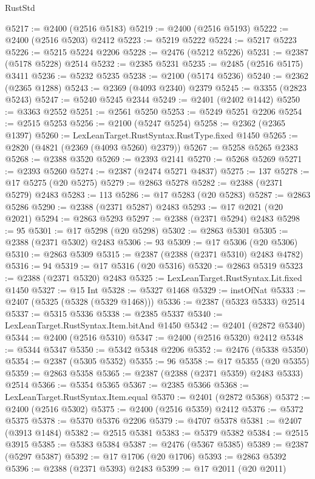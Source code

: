 \begin{lexlean}{RustStd}
\begin{coremodule}
@5217 := @2400 (@2516 @5183)
@5219 := @2400 (@2516 @5193)
@5222 := @2400 (@2516 @5203) @2412
@5223 := @5219 @5222
@5224 := @5217 @5223
@5226 := @5215 @5224 @2206
@5228 := @2476 (@5212 @5226)
@5231 := @2387 (@5178 @5228) @2514
@5232 := @2385 @5231
@5235 := @2485 (@2516 @5175) @3411
@5236 := @5232 @5235
@5238 := @2100 (@5174 @5236)
@5240 := @2362 (@2365 @1288)
@5243 := @2369 (@4093 @2340) @2379
@5245 := @3355 (@2823 @5243)
@5247 := @5240 @5245 @2344
@5249 := @2401 (@2402 @1442)
@5250 := @3363 @2552
@5251 := @2561 @5250
@5253 := @5249 @5251 @2206
@5254 := @2515 @5253
@5256 := @2100 (@5247 @5254)
@5258 := @2362 (@2365 @1397)
@5260 := LexLeanTarget.RustSyntax.RustType.fixed @1450
@5265 := @2820 (@4821 (@2369 (@4093 @5260) @2379))
@5267 := @5258 @5265 @2383
@5268 := @2388 @3520
@5269 := @2393 @2141
@5270 := @5268 @5269
@5271 := @2393 @5260
@5274 := @2387 (@2474 @5271 @4837)
@5275 := 137
@5278 := @17 @5275 (@20 @5275)
@5279 := @2863 @5278
@5282 := @2388 (@2371 @5279) @2483
@5283 := 113
@5286 := @17 @5283 (@20 @5283)
@5287 := @2863 @5286
@5290 := @2388 (@2371 @5287) @2483
@5293 := @17 @2021 (@20 @2021)
@5294 := @2863 @5293
@5297 := @2388 (@2371 @5294) @2483
@5298 := 95
@5301 := @17 @5298 (@20 @5298)
@5302 := @2863 @5301
@5305 := @2388 (@2371 @5302) @2483
@5306 := 93
@5309 := @17 @5306 (@20 @5306)
@5310 := @2863 @5309
@5315 := @2387 (@2388 (@2371 @5310) @2483 @4782)
@5316 := 94
@5319 := @17 @5316 (@20 @5316)
@5320 := @2863 @5319
@5323 := @2388 (@2371 @5320) @2483
@5325 := LexLeanTarget.RustSyntax.Lit.fixed @1450
@5327 := @15 Int
@5328 := @5327 @1468
@5329 := instOfNat
@5333 := @2407 (@5325 (@5328 (@5329 @1468)))
@5336 := @2387 (@5323 @5333) @2514
@5337 := @5315 @5336
@5338 := @2385 @5337
@5340 := LexLeanTarget.RustSyntax.Item.bitAnd @1450
@5342 := @2401 (@2872 @5340)
@5344 := @2400 (@2516 @5310)
@5347 := @2400 (@2516 @5320) @2412
@5348 := @5344 @5347
@5350 := @5342 @5348 @2206
@5352 := @2476 (@5338 @5350)
@5354 := @2387 (@5305 @5352)
@5355 := 96
@5358 := @17 @5355 (@20 @5355)
@5359 := @2863 @5358
@5365 := @2387 (@2388 (@2371 @5359) @2483 @5333) @2514
@5366 := @5354 @5365
@5367 := @2385 @5366
@5368 := LexLeanTarget.RustSyntax.Item.equal
@5370 := @2401 (@2872 @5368)
@5372 := @2400 (@2516 @5302)
@5375 := @2400 (@2516 @5359) @2412
@5376 := @5372 @5375
@5378 := @5370 @5376 @2206
@5379 := @4707 @5378
@5381 := @2407 (@3913 @1484)
@5382 := @2515 @5381
@5383 := @5379 @5382
@5384 := @2515 @3915
@5385 := @5383 @5384
@5387 := @2476 (@5367 @5385)
@5389 := @2387 (@5297 @5387)
@5392 := @17 @1706 (@20 @1706)
@5393 := @2863 @5392
@5396 := @2388 (@2371 @5393) @2483
@5399 := @17 @2011 (@20 @2011)

\end{coremodule}
\end{lexlean}
